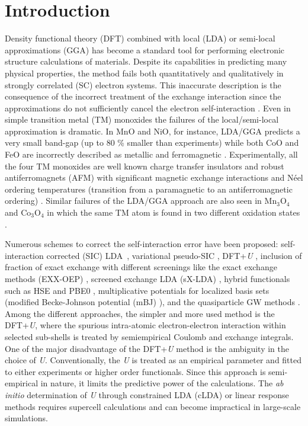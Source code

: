 \documentclass[12pt,a4paper,final]{iopart}
\begin{document}

\section{Introduction}
\label{sec:intro}
Density functional theory (DFT) combined with local (LDA) or semi-local approximations (GGA) \cite{perdew1981self,perdew1996generalized} has become a standard tool for performing electronic structure calculations of materials. Despite its capabilities in predicting many physical properties, the method fails both quantitatively and qualitatively in strongly correlated (SC) electron systems. This inaccurate description is the consequence of the incorrect treatment of the exchange interaction since the approximations do not sufficiently cancel the electron self-interaction \cite{perdew1981self,jones1989density}. Even in simple transition metal (TM) monoxides the failures of the local/semi-local approximation is dramatic. In MnO and NiO, for instance, LDA/GGA predicts a very small band-gap (up to 80 \% smaller than experiments) while both CoO and FeO are incorrectly described as metallic and ferromagnetic \cite{anisimov1997first}. Experimentally, all the four TM monoxides are well known charge transfer insulators and robust antiferromagnets (AFM)  with significant magnetic exchange interactions and N\'eel ordering temperatures (transition from a paramagnetic to an antiferromagnetic ordering) \cite{roth1958magnetic}. Similar failures of the LDA/GGA approach are also seen in Mn$_3$O$_4$ and Co$_3$O$_4$ in which the same TM atom is found in two different oxidation states \cite{chartier1999ab,roth1964magnetic}.  


Numerous schemes to correct the self-interaction error have been proposed: self-interaction corrected (SIC) LDA~\cite{perdew1981self}, variational pseudo-SIC \cite{filippetti2011variational}, DFT+\textit{U}  \cite{anisimov1997first,himmetoglu2014hubbard,toroker2011first}, inclusion of fraction of exact exchange with different screenings like the exact exchange methods (EXX-OEP) \cite{engel2009insulating}, screened exchange LDA (sX-LDA) \cite{gillen2013accurate}, hybrid functionals such as HSE \cite{heyd2003hybrid} and PBE0 \cite{perdew1996rationale}, multiplicative potentials for localized basis sets (modified Becke-Johnson potential (mBJ) \cite{tran2009accurate}), and the quasiparticle GW methods \cite{aryasetiawan1998gw}. Among the different approaches, the simpler and more used method is the DFT+\textit{U}, where the spurious intra-atomic electron-electron interaction within selected sub-shells is treated by semiempirical Coulomb and exchange integrals. One of the major disadvantage of the DFT+\textit{U} method is the ambiguity in the choice of \textit{U}. Conventionally, the \textit{U} is treated as an empirical parameter and fitted to either experiments or higher order functionals. Since this approach is semi-empirical in nature, it limits the predictive power of the calculations. The \textit{ab initio} determination of \textit{U} through constrained LDA (cLDA) or linear response methods \cite{gunnarsson1989density2,cococcioni2005linear}  requires supercell calculations and can become impractical in large-scale simulations. 
\end{document}
